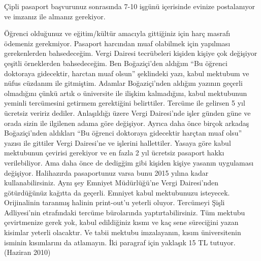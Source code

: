 \documentclass[12pt]{article}
\begin{document}
Çipli pasaport başvurunuz sonrasında 7-10 işgünü içerisinde evinize postalanıyor ve imzanız ile almanız gerekiyor. 

Öğrenci olduğunuz ve eğitim/kültür amacıyla gittiğiniz için harç masrafı ödemeniz gerekmiyor. Pasaport harcından muaf olabilmek için yapılması gerekenlerden bahsedeceğim. Vergi Dairesi tecrübeleri kişiden kişiye çok değişiyor çeşitli örneklerden bahsedeceğim. Ben Boğaziçi'den aldığım ``Bu öğrenci doktoraya gidecektir, harctan muaf olsun'' şeklindeki yazı, kabul mektubum ve nüfus cüzdanım ile gitmiştim. Adamlar Boğaziçi'nden aldığım yazının geçerli olmadığını çünkü artık o üniversite ile ilişkim kalmadığını, kabul mektubunun yeminli tercümesini getirmem gerektiğini belirttiler. Tercüme ile gelirsen 5 yıl ücretsiz veririz dediler. Anlaşıldığı üzere Vergi Dairesi'nde işler günden güne ve orada sizin ile ilgilenen adama göre değişiyor. Ayrıca daha önce birçok arkadaş Boğaziçi'nden aldıkları ``Bu öğrenci doktoraya gidecektir harçtan muaf olsu'' yazısı ile gittiler Vergi Dairesi'ne ve işlerini hallettiler. Yasaya göre kabul mektubunun çevirisi gerekiyor ve en fazla 2 yıl ücretsiz pasaport hakkı verilebiliyor. Ama daha önce de dedigğim gibi kişiden kişiye yasanın uygulaması değişiyor.  Halihazırda pasaportunuz varsa bunu 2015 yılına kadar kullanabilirsiniz. Aynı şey Emniyet Müdürlüğü'ne Vergi Dairesi’nden götürdüğünüz kağıtta da geçerli. Emniyet kabul mektubunuzu isteyecek. Orijinalinin taranmış halinin print-out'u yeterli oluyor. Tercümeyi Şişli Adliyesi'nin etrafındaki tercüme bürolarında yaptırtabilirsiniz. Tüm mektubu çevirtmenize gerek yok, kabul edildiğiniz kısmı ve kaç sene süreciğini yazan kisimlar yeterli olacaktır. Ve tabii mektubu imzalayanın, kısım üniversitenin isminin kısımlarını da atlamayın. İki paragraf için yaklaşık 15 TL tutuyor. (Haziran 2010) 
\end{document}
